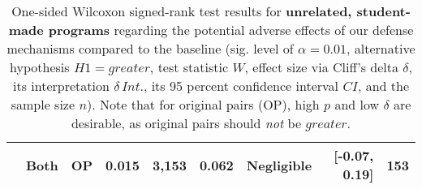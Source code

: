 \begin{table}
\begin{tabular}{lrrrrrrrr}
   & Both & OP & 0.015 & 3,153 & 0.062 & Negligible & [-0.07, 0.19] & 153 \\ 
   \bottomrule
\end{tabular}
\caption[Statistical Tests: Unrelated Pairs]{One-sided Wilcoxon signed-rank test results for \textbf{unrelated, student-made programs} regarding the potential adverse effects of our defense mechanisms compared to the baseline (sig. level of $\alpha=0.01$, alternative hypothesis $H1=greater$, test statistic $W$, effect size via Cliff's delta $\delta$, its interpretation $\delta\,Int.$, its 95 percent confidence interval $CI$, and the sample size $n$). Note that for original pairs (OP), high $p$ and low $\delta$ are desirable, as original pairs should \textit{not} be $greater$.} 
\label{tab:to-base-original}
\end{table}
